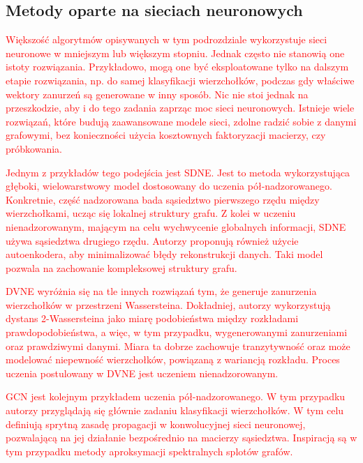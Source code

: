     \subsection{Metody oparte na sieciach neuronowych}
        \textcolor{red}{
        Większość algorytmów opisywanych w tym podrozdziale wykorzystuje sieci neuronowe w mniejszym lub większym stopniu. Jednak często nie stanowią one istoty rozwiązania. Przykładowo, mogą one być eksploatowane tylko na dalszym etapie rozwiązania, np. do samej klasyfikacji wierzchołków, podczas gdy właściwe wektory zanurzeń są generowane w inny sposób. Nic nie stoi jednak na przeszkodzie, aby i do tego zadania zaprząc moc sieci neuronowych. Istnieje wiele rozwiązań, które budują zaawansowane modele sieci, zdolne radzić sobie z danymi grafowymi, bez konieczności użycia kosztownych faktoryzacji macierzy, czy próbkowania.}

        \textcolor{red}{
        Jednym z przykładów tego podejścia jest SDNE\cite{Wang_Cui_Zhu_2016}. Jest to metoda wykorzystująca głęboki, wielowarstwowy model dostosowany do uczenia pół-nadzorowanego. Konkretnie, część nadzorowana bada sąsiedztwo pierwszego rzędu między wierzchołkami, ucząc się lokalnej struktury grafu. Z kolei w uczeniu nienadzorowanym, mającym na celu wychwycenie globalnych informacji, SDNE używa sąsiedztwa drugiego rzędu. Autorzy proponują również użycie autoenkodera, aby minimalizować błędy rekonstrukcji danych. Taki model pozwala na zachowanie kompleksowej struktury grafu.}
        
        \textcolor{red}{
        DVNE\cite{Zhu_Cui_Wang_Zhu_2018} wyróżnia się na tle innych rozwiązań tym, że generuje zanurzenia wierzchołków w przestrzeni Wassersteina. Dokładniej, autorzy wykorzystują dystans 2-Wassersteina jako miarę podobieństwa między rozkładami prawdopodobieństwa, a więc, w tym przypadku, wygenerowanymi zanurzeniami oraz prawdziwymi danymi. Miara ta dobrze zachowuje tranzytywność oraz może modelować niepewność wierzchołków, powiązaną z wariancją rozkładu. Proces uczenia postulowany w DVNE jest uczeniem nienadzorowanym.}
        
        \textcolor{red}{
        GCN\cite{DBLP:journals/corr/KipfW16} jest kolejnym przykładem uczenia pół-nadzorowanego. W tym przypadku autorzy przyglądają się głównie zadaniu klasyfikacji wierzchołków. W tym celu definiują sprytną zasadę propagacji w konwolucyjnej sieci neuronowej, pozwalającą na jej działanie bezpośrednio na macierzy sąsiedztwa. Inspiracją są w tym przypadku metody aproksymacji spektralnych splotów grafów.}
        
